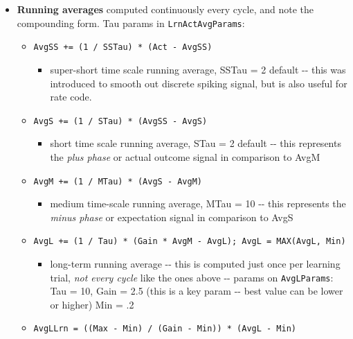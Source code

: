 \begin{itemize}
\item
  \textbf{Running averages} computed continuously every cycle, and note
  the compounding form. Tau params in \texttt{LrnActAvgParams}:

  \begin{itemize}
  \tightlist
  \item
    \texttt{AvgSS\ +=\ (1\ /\ SSTau)\ *\ (Act\ -\ AvgSS)}

    \begin{itemize}
    \tightlist
    \item
      super-short time scale running average, SSTau = 2 default -\/-
      this was introduced to smooth out discrete spiking signal, but is
      also useful for rate code.
    \end{itemize}
  \item
    \texttt{AvgS\ +=\ (1\ /\ STau)\ *\ (AvgSS\ -\ AvgS)}

    \begin{itemize}
    \tightlist
    \item
      short time scale running average, STau = 2 default -\/- this
      represents the \emph{plus phase} or actual outcome signal in
      comparison to AvgM
    \end{itemize}
  \item
    \texttt{AvgM\ +=\ (1\ /\ MTau)\ *\ (AvgS\ -\ AvgM)}

    \begin{itemize}
    \tightlist
    \item
      medium time-scale running average, MTau = 10 -\/- this represents
      the \emph{minus phase} or expectation signal in comparison to AvgS
    \end{itemize}
  \item
    \texttt{AvgL\ +=\ (1\ /\ Tau)\ *\ (Gain\ *\ AvgM\ -\ AvgL);\ AvgL\ =\ MAX(AvgL,\ Min)}

    \begin{itemize}
    \tightlist
    \item
      long-term running average -\/- this is computed just once per
      learning trial, \emph{not every cycle} like the ones above -\/-
      params on \texttt{AvgLParams}: Tau = 10, Gain = 2.5 (this is a key
      param -\/- best value can be lower or higher) Min = .2
    \end{itemize}
  \item
    \texttt{AvgLLrn\ =\ ((Max\ -\ Min)\ /\ (Gain\ -\ Min))\ *\ (AvgL\ -\ Min)}


\end{itemize}
\end{itemize}

